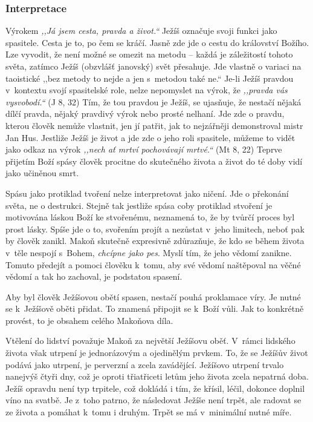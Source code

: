 \subsubsection*{Interpretace}

Výrokem \textit{,,Já jsem cesta, pravda a život.``} Ježíš označuje svoji funkci
jako spasitele. Cesta je to, po čem se kráčí. Jasně zde jde o cestu do
království Božího. Lze vyvodit, že není možné se omezit na metodu -- každá
je záležitostí tohoto světa, zatímco Ježíš (obzvlášť janovský) svět přesahuje.
Jde vlastně o variaci na taoistické ,,bez metody to nejde a jen s~metodou také
ne.`` Je-li Ježíš pravdou v~kontextu svojí spasitelské role, nelze nepomyslet na
výrok, že \textit{,,pravda vás vysvobodí.``} (J 8, 32) Tím, že tou pravdou je Ježíš, se ujasňuje,
že nestačí nějaká dílčí pravda, nějaký pravdivý výrok nebo prosté nelhaní. Jde
zde o pravdu, kterou člověk nemůže vlastnit, jen jí patřit, jak to nejzářněji
demonstroval mistr Jan Hus. Jestliže Ježíš je život a jde zde o jeho roli
spasitele, můžeme to vidět jako odkaz na výrok \textit{,,nech ať mrtví pochovávají
mrtvé.``} (Mt 8, 22) Teprve přijetím Boží spásy člověk procitne do skutečného života a život
do té doby vidí jako učiněnou smrt.

Spásu jako protiklad tvoření nelze interpretovat jako ničení. Jde o překonání
světa, ne o destrukci. Stejně tak jestliže spása coby protiklad stvoření je
motivována láskou Boží ke stvořenému, neznamená to, že by tvůrčí proces byl
prost lásky. Spíše jde o to, svořením projít a nezůstat v~jeho limitech, neboť
pak by člověk zanikl. Makoň skutečně expresivně zdůrazňuje, že kdo se během
života v~těle nespojí s~Bohem, \textit{chcípne jako
pes}. Myslí tím, že jeho vědomí
zanikne. Tomuto předejít a pomoci člověku k~tomu, aby své vědomí naštěpoval na
věčné vědomí a tak ho zachoval, je podstatou spasení.

Aby byl člověk Ježíšovou obětí spasen, nestačí pouhá proklamace víry. Je nutné
se k~Ježíšově oběti přidat. To znamená připojit se k~Boží vůli. Jak to konkrétně
provést, to je obsahem celého Makoňova díla.

Vtělení do lidství považuje Makoň za největší Ježíšovu oběť. V~rámci lidského
života však utrpení je jednorázovým a ojedinělým prvkem. To, že se Ježíšův
život podává jako utrpení, je perverzní a zcela zavádějící. Ježíšovo utrpení
trvalo nanejvýš čtyři dny, což je oproti třiatřiceti letům jeho života zcela
nepatrná doba. Ježíš opravdu není typ trpitele, což dokládá i tím, že křísil,
léčil, dokonce doplnil víno na svatbě. Je z~toho patrno, že následovat Ježíše
není trpět, ale radovat se ze života a pomáhat k~tomu i druhým. Trpět se má
v~minimální nutné míře.

